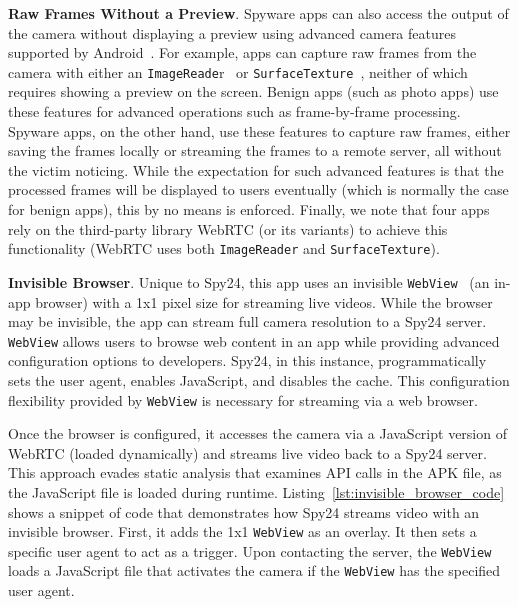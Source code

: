 \textbf{Raw Frames Without a Preview}.
Spyware apps can also access the output of the camera without displaying a
preview using advanced camera features supported by
Android~\cite{Cameraca74:online}. For example, apps can capture raw frames from
the camera with either an \texttt{ImageReade}r~\cite{Cameraca74:online} or
\texttt{SurfaceTexture}~\cite{SurfaceT78:online}, neither of which requires showing a
preview on the screen.
Benign apps (such as photo apps) use these
features for advanced operations such as frame-by-frame processing. Spyware
apps, on the other hand, use these features to capture raw frames, either saving
the frames locally or streaming the frames to a remote server, all without the
victim noticing. While the expectation for such advanced features is that the
processed frames will be displayed to users eventually (which is normally the
case for benign apps), this by no means is enforced. Finally, we note that four
apps rely on the third-party library WebRTC (or its variants) to achieve this functionality (WebRTC uses both \texttt{ImageReader} and \texttt{SurfaceTexture}).


\textbf{Invisible Browser}. Unique to Spy24, this app uses an invisible
\texttt{WebView}~\cite{WebViewA25:online} (an in-app browser) with a 1x1 pixel size for
streaming live videos. While the browser may be invisible, the app can stream
full camera resolution to a Spy24 server.
\texttt{WebView} allows users to browse web content in an app while providing advanced
configuration options to developers. Spy24, in this instance, programmatically sets
the user agent, enables JavaScript, and disables the cache. This configuration
flexibility provided by \texttt{WebView} is necessary for streaming via a web browser.

Once the browser is configured, it accesses the camera via a JavaScript version
of WebRTC (loaded dynamically) and streams live video back to a Spy24 server.
This approach evades static analysis that examines API calls in the APK file, as
the JavaScript file is loaded during runtime.
Listing~\ref{lst:invisible_browser_code} shows a snippet of code that
demonstrates how Spy24 streams video with an invisible browser. First, it adds the 1x1 \texttt{WebView} as an overlay.  It then sets a specific user
agent to act as a trigger. Upon contacting the server, the \texttt{WebView} loads a
JavaScript file that activates the camera if the \texttt{WebView} has the specified user
agent.

